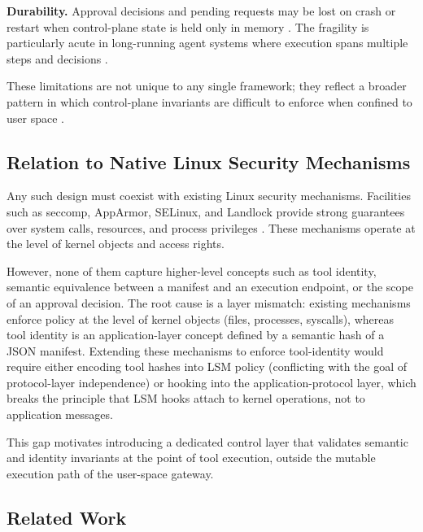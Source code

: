 \textbf{Durability.}
Approval decisions and pending requests may be lost on crash or restart when control-plane state is held only in memory \cite{packer2023memgpt}.
The fragility is particularly acute in long-running agent systems where execution spans multiple steps and decisions \cite{wang2023voyager, yang2024swe}.

These limitations are not unique to any single framework; they reflect a broader pattern in which control-plane invariants \cite{lim2024compartmentalization} are difficult to enforce when confined to user space \cite{schneider2022sok, lefeuvre2024sok, ji2026seagent, shi2025progent}.




\subsection{Relation to Native Linux Security Mechanisms}

Any such design must coexist with existing Linux security mechanisms.
Facilities such as seccomp, AppArmor, SELinux, and Landlock provide strong guarantees over system calls, resources, and process privileges \cite{seccomp2026, lsm2026, apparmor2026, selinux2026, landlock2026}.
These mechanisms operate at the level of kernel objects and access rights.

However, none of them capture higher-level concepts such as tool identity, semantic equivalence between a manifest and an execution endpoint, or the scope of an approval decision.
The root cause is a layer mismatch: existing mechanisms enforce policy at the level of kernel objects (files, processes, syscalls), whereas tool identity is an application-layer concept defined by a semantic hash of a JSON manifest.
Extending these mechanisms to enforce tool-identity would require either encoding tool hashes into LSM policy (conflicting with the goal of protocol-layer independence) or hooking into the application-protocol layer, which breaks the principle that LSM hooks attach to kernel operations, not to application messages.

This gap motivates introducing a dedicated control layer that validates semantic and identity invariants at the point of tool execution, outside the mutable execution path of the user-space gateway.



\subsection{Related Work}
\label{sec:related-work}

